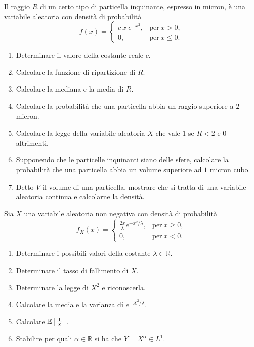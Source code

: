 Il raggio $R$ di un certo tipo di particella inquinante, espresso in micron, è una variabile aleatoria con densità di probabilità
\begin{equation*}
f( x) =\begin{cases}
c\ x\ e^{-x^{2}} , & \text{per} \ x >0,\\
0, & \text{per} \ x\leq 0.
\end{cases}
\end{equation*}
\begin{enumerate}
\item Determinare il valore della costante reale $c$.
\item Calcolare la funzione di ripartizione di $R$.
\item Calcolare la mediana e la media di $R$.
\item Calcolare la probabilità che una particella abbia un raggio superiore a $2$ micron.
\item Calcolare la legge della variabile aleatoria $X$ che vale $1$ se $R< 2$ e $0$ altrimenti.
\item Supponendo che le particelle inquinanti siano delle sfere, calcolare la probabilità che una particella abbia un volume superiore ad $1$ micron cubo.
\item Detto $V$ il volume di una particella, mostrare che si tratta di una variabile aleatoria continua e calcolarne la densità.
\end{enumerate}
\Esercizio{}

Sia $X$ una variabile aleatoria non negativa con densità di probabilità
\begin{equation*}
f_{X}( x) =\begin{cases}
\frac{2x}{\lambda } e^{-x^{2} /\lambda } , & \text{per} \ x\geq 0,\\
0, & \text{per} \ x< 0.
\end{cases}
\end{equation*}
\begin{enumerate}
\item Determinare i possibili valori della costante $\lambda \in \mathbb{R}$.
\item Determinare il tasso di fallimento di $X$.
\item Determinare la legge di $X^{2}$ e riconoscerla.
\item Calcolare la media e la varianza di $e^{-X^{2} /\lambda }$.
\item Calcolare $\mathbb{E}\left[\frac{1}{X}\right]$.
\item Stabilire per quali $\alpha \in \mathbb{R}$ si ha che $Y=X^{\alpha } \in L^{1}$.
\end{enumerate}
\Esercizio{}

